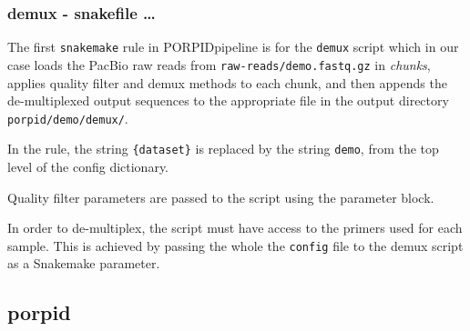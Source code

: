 \documentclass{beamer}
\begin{document}

\begin{frame}[fragile]
\frametitle{demux - snakefile  \ldots }

\alert<1> 

The first {\tt snakemake} rule in PORPIDpipeline is for the
{\tt demux} script which in our case loads the PacBio raw reads from 
{\tt raw-reads/demo.fastq.gz} in {\em chunks}, applies quality filter 
and demux methods to each chunk, and then appends the de-multiplexed output
sequences to the appropriate file in the output directory {\tt porpid/demo/demux/}.

\bigskip
In the rule, the string {\tt \{dataset\}} is replaced by the string {\tt demo},
from the top level of the config dictionary. 

\bigskip
Quality filter parameters are passed to the script using the parameter block.

\bigskip
In order to de-multiplex, the script must have access to the primers used for each sample.
This is achieved by passing the whole the {\tt config} file to the demux script
as a Snakemake parameter.

\end{frame}


\subsection{porpid}
\end{document}
